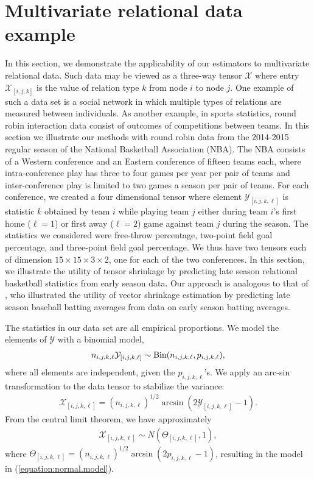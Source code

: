 \section{Multivariate relational data example}
\label{sec:NBA}

In this section, we demonstrate the applicability of our estimators to
multivariate relational data.  Such data may be viewed as a three-way
tensor $\mathcal{X}$ where entry $\mathcal{X}_{[i,j,k]}$ is the value
of relation type $k$ from node $i$ to node $j$. One example of such a
data set is a social network in which multiple types of relations are
measured between individuals.  As another example, in sports
statistics, round robin interaction data consist of outcomes of
competitions between teams. In this section we illustrate our methods
with round robin data from the 2014-2015 regular season of the
National Basketball Association (NBA). The NBA consists of a Western
conference and an Eastern conference of fifteen teams each, where
intra-conference play has three to four games per year per pair of
teams and inter-conference play is limited to two games a season per
pair of teams. For each conference, we created a four dimensional
tensor where element $\mathcal{Y}_{[i,j,k,\ell]}$ is statistic $k$
obtained by team $i$ while playing team $j$ either during team $i$'s
first home ($\ell = 1$) or first away ($\ell = 2$) game against team
$j$ during the season. The statistics we considered were free-throw
percentage, two-point field goal percentage, and three-point field
goal percentage. We thus have two tensors each of dimension $15 \times
15 \times 3 \times 2$, one for each of the two conferences.  In this
section, we illustrate the utility of tensor shrinkage by predicting
late season relational basketball statistics from early season
data. Our approach is analogous to that of \cite{efron1975data}, who
illustrated the utility of vector shrinkage estimation by predicting
late season baseball batting averages from data on early season
batting averages.

The statistics in our data set are all empirical proportions. We model
the elements of $\mathcal{Y}$ with a binomial model,
\begin{align*}
  n_{i,j,k,\ell}\mathcal{Y}_{[i,j,k,\ell]} \sim \operatorname*{Bin}(n_{i,j,k,\ell},p_{i,j,k,\ell}),
\end{align*}
where all elements are independent, given the $p_{i,j,k,\ell}$'s. We
apply an arc-sin transformation to the data tensor to stabilize the
variance:
\begin{align*}
  \mathcal{X}_{[i,j,k,\ell]} = (n_{i,j,k,\ell})^{1/2}\arcsin(2\mathcal{Y}_{[i,j,k,\ell]} - 1).
\end{align*}
From the central limit theorem, we have approximately
\begin{align*}
  \mathcal{X}_{[i,j,k,\ell]} \sim N(\Theta_{[i,j,k,\ell]},1),
\end{align*}
where $\Theta_{[i,j,k,\ell]} =
(n_{i,j,k,\ell})^{1/2}\arcsin(2p_{i,j,k,\ell} - 1)$, resulting in the
model in (\ref{equation:normal.model}).

